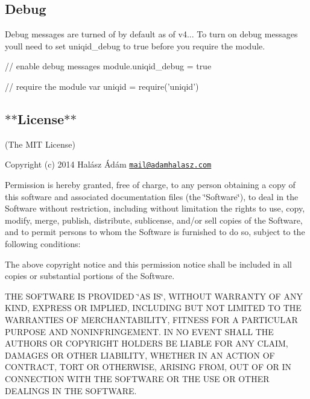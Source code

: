 \subsection*{Debug}

Debug messages are turned of by default as of {\ttfamily v4..}. To turn on debug messages you\textquotesingle{}ll need to set {\ttfamily uniqid\+\_\+debug} to {\ttfamily true} before you require the module.


\begin{DoxyCode}
// enable debug messages
module.uniqid\_debug = true

// require the module
var uniqid = require('uniqid')
\end{DoxyCode}


\subsection*{$\ast$$\ast$\+License$\ast$$\ast$}

(The M\+IT License)

Copyright (c) 2014 Halász Ádám \href{mailto:mail@adamhalasz.com}{\tt mail@adamhalasz.\+com}

Permission is hereby granted, free of charge, to any person obtaining a copy of this software and associated documentation files (the \char`\"{}\+Software\char`\"{}), to deal in the Software without restriction, including without limitation the rights to use, copy, modify, merge, publish, distribute, sublicense, and/or sell copies of the Software, and to permit persons to whom the Software is furnished to do so, subject to the following conditions\+:

The above copyright notice and this permission notice shall be included in all copies or substantial portions of the Software.

T\+HE S\+O\+F\+T\+W\+A\+RE IS P\+R\+O\+V\+I\+D\+ED \char`\"{}\+A\+S I\+S\char`\"{}, W\+I\+T\+H\+O\+UT W\+A\+R\+R\+A\+N\+TY OF A\+NY K\+I\+ND, E\+X\+P\+R\+E\+SS OR I\+M\+P\+L\+I\+ED, I\+N\+C\+L\+U\+D\+I\+NG B\+UT N\+OT L\+I\+M\+I\+T\+ED TO T\+HE W\+A\+R\+R\+A\+N\+T\+I\+ES OF M\+E\+R\+C\+H\+A\+N\+T\+A\+B\+I\+L\+I\+TY, F\+I\+T\+N\+E\+SS F\+OR A P\+A\+R\+T\+I\+C\+U\+L\+AR P\+U\+R\+P\+O\+SE A\+ND N\+O\+N\+I\+N\+F\+R\+I\+N\+G\+E\+M\+E\+NT. IN NO E\+V\+E\+NT S\+H\+A\+LL T\+HE A\+U\+T\+H\+O\+RS OR C\+O\+P\+Y\+R\+I\+G\+HT H\+O\+L\+D\+E\+RS BE L\+I\+A\+B\+LE F\+OR A\+NY C\+L\+A\+IM, D\+A\+M\+A\+G\+ES OR O\+T\+H\+ER L\+I\+A\+B\+I\+L\+I\+TY, W\+H\+E\+T\+H\+ER IN AN A\+C\+T\+I\+ON OF C\+O\+N\+T\+R\+A\+CT, T\+O\+RT OR O\+T\+H\+E\+R\+W\+I\+SE, A\+R\+I\+S\+I\+NG F\+R\+OM, O\+UT OF OR IN C\+O\+N\+N\+E\+C\+T\+I\+ON W\+I\+TH T\+HE S\+O\+F\+T\+W\+A\+RE OR T\+HE U\+SE OR O\+T\+H\+ER D\+E\+A\+L\+I\+N\+GS IN T\+HE S\+O\+F\+T\+W\+A\+RE. 